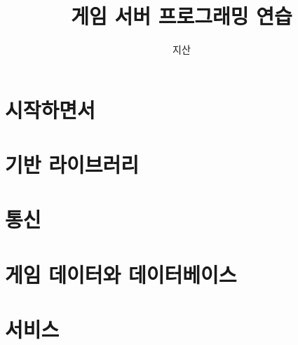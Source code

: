 \documentclass{book}
\begin{document}
\title{게임 서버 프로그래밍 연습}
\author{지산}
\maketitle
\tableofcontents

\part{시작하면서}



\part{기반 라이브러리}



\part{통신}


\part{게임 데이터와 데이터베이스}


\part{서비스}

\end{document}
